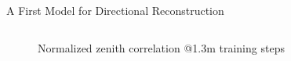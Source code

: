 \begin{frame}{A First Model for Directional Reconstruction}
\begin{columns}
\begin{column}{.65\textwidth}
\begin{figure}
{                    \caption*{\small Normalized zenith correlation @1.3m training steps}
                }
            \end{figure}
        \end{column}
    \end{columns}
\end{frame}
